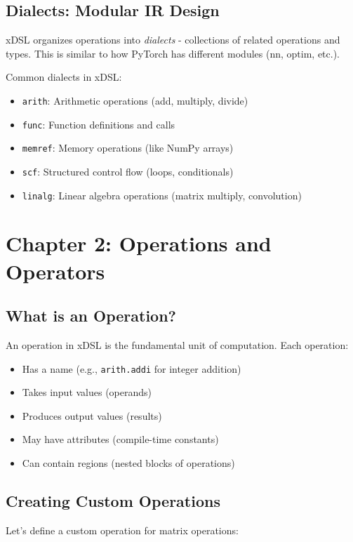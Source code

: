 \documentclass[11pt,a4paper]{article}
\begin{document}
\subsection{Dialects: Modular IR Design}

xDSL organizes operations into \textit{dialects} - collections of related operations and types. This is similar to how PyTorch has different modules (nn, optim, etc.).

Common dialects in xDSL:
\begin{itemize}
    \item \texttt{arith}: Arithmetic operations (add, multiply, divide)
    \item \texttt{func}: Function definitions and calls
    \item \texttt{memref}: Memory operations (like NumPy arrays)
    \item \texttt{scf}: Structured control flow (loops, conditionals)
    \item \texttt{linalg}: Linear algebra operations (matrix multiply, convolution)
\end{itemize}

\section{Chapter 2: Operations and Operators}

\subsection{What is an Operation?}

An operation in xDSL is the fundamental unit of computation. Each operation:
\begin{itemize}
    \item Has a name (e.g., \texttt{arith.addi} for integer addition)
    \item Takes input values (operands)
    \item Produces output values (results)
    \item May have attributes (compile-time constants)
    \item Can contain regions (nested blocks of operations)
\end{itemize}

\subsection{Creating Custom Operations}

Let's define a custom operation for matrix operations:
\end{document}
